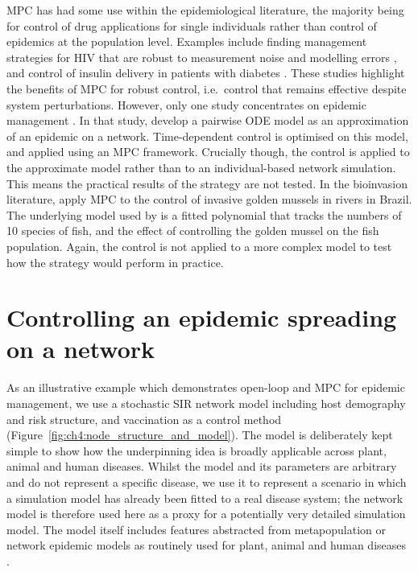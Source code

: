 MPC has had some use within the epidemiological literature, the majority being for control of drug applications for single individuals rather than control of epidemics at the population level. Examples include finding management strategies for HIV that are robust to measurement noise and modelling errors \citep{zurakowski_model_2006, david_receding_2011}, and control of insulin delivery in patients with diabetes \citep{hovorka_nonlinear_2004}. These studies highlight the benefits of MPC for robust control, i.e.\ control that remains effective despite system perturbations. However, only one study concentrates on epidemic management \citep{selley_dynamic_2015}. In that study, \citeauthor{selley_dynamic_2015} develop a pairwise ODE model as an approximation of an epidemic on a network. Time-dependent control is optimised on this model, and applied using an MPC framework. Crucially though, the control is applied to the approximate model rather than to an individual-based network simulation. This means the practical results of the strategy are not tested. In the bioinvasion literature, \citet{de_model_2019} apply MPC to the control of invasive golden mussels in rivers in Brazil. The underlying model used by \citet{de_model_2019} is a fitted polynomial that tracks the numbers of 10 species of fish, and the effect of controlling the golden mussel on the fish population. Again, the control is not applied to a more complex model to test how the strategy would perform in practice.

\section{Controlling an epidemic spreading on a network\label{sec:ch4:Controlling}}

As an illustrative example which demonstrates open-loop and MPC for epidemic management, we use a stochastic SIR network model including host demography and risk structure, and vaccination as a control method (Figure~\ref{fig:ch4:node_structure_and_model}). The model is deliberately kept simple to show how the underpinning idea is broadly applicable across plant, animal and human diseases. Whilst the model and its parameters are arbitrary and do not represent a specific disease, we use it to represent a scenario in which a simulation model has already been fitted to a real disease system; the network model is therefore used here as a proxy for a potentially very detailed simulation model. The model itself includes features abstracted from metapopulation or network epidemic models as routinely used for plant, animal and human diseases \citep[e.g.][]{rowthorn_optimal_2009, keeling_dynamics_2001, keeling_metapopulation_2000, margosian_connectivity_2009, bansal_individual_2007}.

